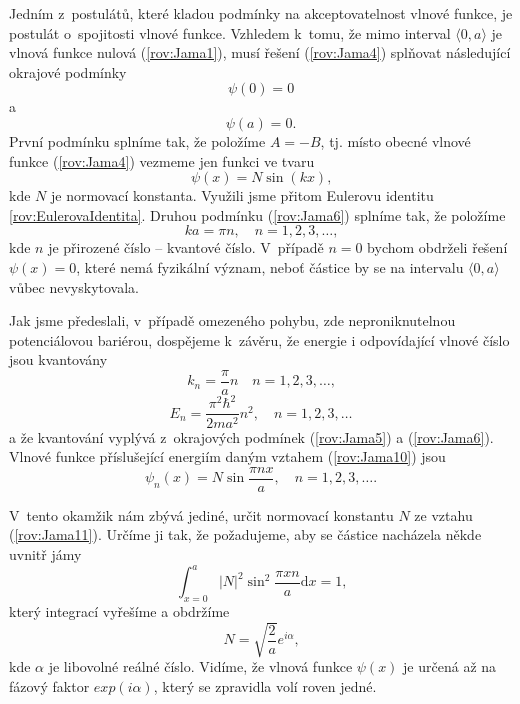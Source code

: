 Jedním z~postulátů, které kladou podmínky na akceptovatelnost vlnové funkce, je postulát o~spojitosti vlnové funkce. Vzhledem k~tomu, že mimo interval $\langle0,a\rangle$ je vlnová funkce nulová (\ref{rov:Jama1}), musí řešení (\ref{rov:Jama4}) splňovat následující okrajové podmínky
\begin{equation}
\psi(0)=0
\label{rov:Jama5}
\end{equation}
a
\begin{equation}
\psi(a)=0 \mbox{.}
\label{rov:Jama6}
\end{equation}
První podmínku splníme tak, že položíme $A = -B$, tj. místo obecné vlnové funkce (\ref{rov:Jama4}) vezmeme jen funkci ve tvaru
\begin{equation}
\psi(x)=N \sin(kx) \mbox{,}
\label{rov:Jama7}
\end{equation}
kde $N$ je normovací konstanta. Využili jsme přitom Eulerovu identitu \eqref{rov:EulerovaIdentita}. Druhou podmínku (\ref{rov:Jama6}) splníme tak, že položíme
\begin{equation}
ka = \pi n, \quad n= 1,2,3, \dots \mbox{,}
\label{rov:Jama8}
\end{equation}
kde $n$ je přirozené číslo -- kvantové číslo. V~případě $n=0$ bychom obdrželi řešení $\psi(x)=0$, které nemá fyzikální význam, neboť částice by se na intervalu $\langle0,a\rangle$ vůbec nevyskytovala.

Jak jsme předeslali, v~případě omezeného pohybu, zde neproniknutelnou potenciálovou bariérou, dospějeme k~závěru, že energie i odpovídající vlnové číslo jsou kvantovány
\begin{equation}
k_n = \frac{\pi}{a}n \quad n=1,2,3, \dots \mbox{,}
\label{rov:Jama9}
\end{equation}
\begin{equation}
\boxed{E_n = \frac{\pi^2\hbar^2}{2ma^2}n^2, \quad n=1,2,3, \dots }
\label{rov:Jama10}
\end{equation}
a že kvantování vyplývá z~okrajových podmínek (\ref{rov:Jama5}) a (\ref{rov:Jama6}). Vlnové funkce příslušející energiím daným vztahem (\ref{rov:Jama10}) jsou
\begin{equation}
\boxed{\psi_n(x) = N \sin \frac{\pi n x}{a}, \quad n=1,2,3,\dots \mbox{.}}
\label{rov:Jama11}
\end{equation}

V~tento okamžik nám zbývá jediné, určit normovací konstantu $N$ ze vztahu (\ref{rov:Jama11}). Určíme ji tak, že požadujeme, aby se částice nacházela někde uvnitř jámy
\begin{equation}
\int_{x=0}^a |N|^2 \sin^2 \frac{\pi x n}{a} \mathrm{d}x = 1 \mbox{,}
\label{rov:Jama12}
\end{equation}
který integrací vyřešíme a obdržíme
\begin{equation}
N = \sqrt{\frac{2}{a}}e^{i\alpha} \mbox{,}
\label{rov:Jama13}
\end{equation}
kde $\alpha$ je libovolné reálné číslo. Vidíme, že vlnová funkce $\psi(x)$ je určená až na fázový faktor $exp(i\alpha)$, který se zpravidla volí roven jedné.

